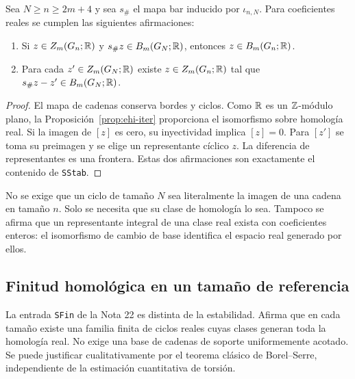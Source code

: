 \begin{proposicion}
\label{prop:ehi-real}
Sea $N\ge n\ge2m+4$ y sea $s_\#$ el mapa bar inducido por $\iota_{n,N}$. Para coeficientes reales se cumplen las siguientes afirmaciones:
\begin{enumerate}
\item Si $z\in Z_m(G_n;\mathbb{R})$ y $s_\# z\in B_m(G_N;\mathbb{R})$, entonces $z\in B_m(G_n;\mathbb{R})$.
\item Para cada $z'\in Z_m(G_N;\mathbb{R})$ existe $z\in Z_m(G_n;\mathbb{R})$ tal que $s_\#z-z'\in B_m(G_N;\mathbb{R})$.
\end{enumerate}
\end{proposicion}
\begin{proof}
El mapa de cadenas conserva bordes y ciclos. Como $\mathbb{R}$ es un $\mathbb{Z}$-módulo plano, la Proposición~\ref{prop:ehi-iter} proporciona el isomorfismo sobre homología real. Si la imagen de $[z]$ es cero, su inyectividad implica $[z]=0$. Para $[z']$ se toma su preimagen y se elige un representante cíclico $z$. La diferencia de representantes es una frontera. Estas dos afirmaciones son exactamente el contenido de \texttt{SStab}.
\end{proof}

No se exige que un ciclo de tamaño $N$ sea literalmente la imagen de una cadena en tamaño $n$. Solo se necesita que su clase de homología lo sea. Tampoco se afirma que un representante integral de una clase real exista con coeficientes enteros: el isomorfismo de cambio de base identifica el espacio real generado por ellos.

\subsection{Finitud homológica en un tamaño de referencia}

La entrada \texttt{SFin} de la Nota 22 es distinta de la estabilidad. Afirma que en cada tamaño existe una familia finita de ciclos reales cuyas clases generan toda la homología real. No exige una base de cadenas de soporte uniformemente acotado. Se puede justificar cualitativamente por el teorema clásico de Borel--Serre, independiente de la estimación cuantitativa de torsión.

